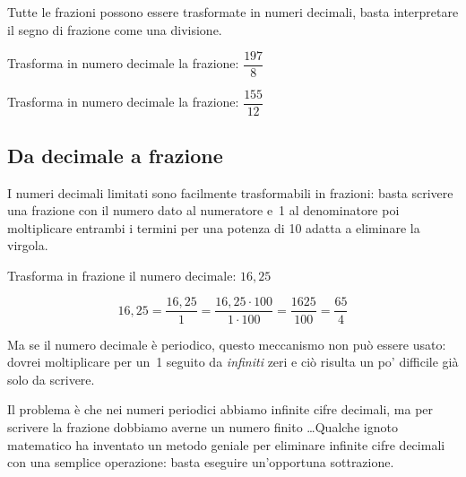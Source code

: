 Tutte le frazioni possono essere trasformate in numeri decimali, basta 
interpretare il segno di frazione come una divisione.

\begin{esempio}
Trasforma in numero decimale la frazione: \(\dfrac{197}{8}\)
\begin{center}
 \begin{center}\end{center}
\end{center}
\end{esempio}

\begin{esempio}
Trasforma in numero decimale la frazione: \(\dfrac{155}{12}\)
\begin{center}
 \begin{center}\end{center}
\end{center}
\end{esempio}

\subsection{Da decimale a frazione}

I numeri decimali limitati sono facilmente trasformabili in frazioni: basta 
scrivere una frazione con il numero dato al numeratore e~1 al denominatore 
poi moltiplicare entrambi i termini per una potenza di 10 adatta a 
eliminare la virgola.

\begin{esempio}
Trasforma in frazione il numero decimale: \(16,25\)
\begin{center}
 \[16,25 = \frac{16,25}{1} = \frac{16,25 \cdot 100}{1 \cdot 100} =
   \frac{1625}{100} = \frac{65}{4}\]
\end{center}
\end{esempio}

Ma se il numero decimale è periodico, questo meccanismo non può essere 
usato: dovrei moltiplicare per un~1 seguito da \emph{infiniti} zeri e ciò 
risulta un po' difficile già solo da scrivere.

Il problema è che nei numeri periodici abbiamo infinite cifre decimali, ma 
per scrivere la frazione dobbiamo averne un numero finito \dots Qualche 
ignoto matematico ha inventato un metodo geniale per eliminare infinite 
cifre decimali con una semplice operazione: basta eseguire un'opportuna 
sottrazione.

